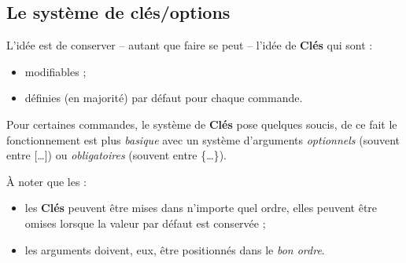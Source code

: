 \documentclass[a4paper,french,11pt]{article}
\newcommand\ctex[1]{\tcbox[vignettelatex]{#1}}
\newcommand\cmaj[1]{%
	{\tcbox[vignetteMaJ]{#1}\xspace}%
}
\newcommand\Cle[1]{{\bfseries\sffamily\textlangle #1\textrangle}}
\begin{document}
%
%
%
%
%
%

\subsection{Le système de \og clés/options \fg}

\begin{codeidee}
L'idée est de conserver -- autant que faire se peut -- l'idée de \Cle{Clés} qui sont :
%
\begin{itemize}
	\item modifiables ;
	\item définies (en majorité) par défaut pour chaque commande.
\end{itemize}

Pour certaines commandes, le système de \Cle{Clés} pose quelques soucis, de ce fait le fonctionnement est plus \textit{basique} avec un système d'\textsf{arguments} \textit{optionnels} (souvent entre \textsf{[\ldots]}) ou \textit{obligatoires} (souvent entre \textsf{\{\ldots\}}).

\smallskip

À noter que les :
%
\begin{itemize}
	\item les \Cle{Clés} peuvent être mises dans n'importe quel ordre, elles peuvent être omises lorsque la valeur par défaut est conservée ;
	\item les \textsf{arguments} doivent, eux, être positionnés dans le \textit{bon ordre}.
\end{itemize}
\end{codeidee}
\end{document}
